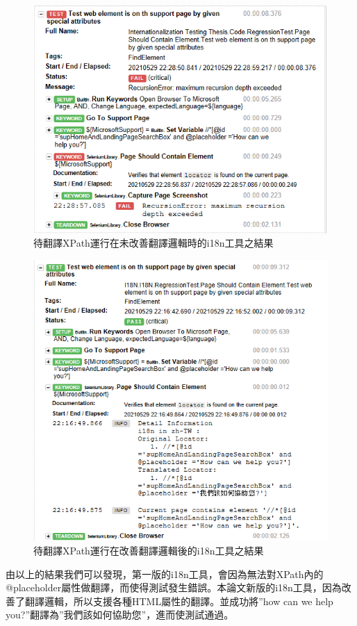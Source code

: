 \begin{figure}[H]
\centering
\includegraphics[width= .8\textwidth]{../論文截圖/4-2-3 @placeholder運行在第一版i18n.png}
\caption{待翻譯XPath運行在未改善翻譯邏輯時的i18n工具之結果}
\end{figure}

\begin{figure}[H]
\centering
\includegraphics[width= \textwidth]{../論文截圖/4-2-4 @placeholder運行在當前i18n版本.png}
\caption{待翻譯XPath運行在改善翻譯邏輯後的i18n工具之結果}
\end{figure}

由以上的結果我們可以發現，第一版的i18n工具，會因為無法對XPath內的@placeholder屬性做翻譯，而使得測試發生錯誤。本論文新版的i18n工具，因為改善了翻譯邏輯，所以支援各種HTML屬性的翻譯。並成功將”how can we help you?”翻譯為”我們該如何協助您”，進而使測試通過。

